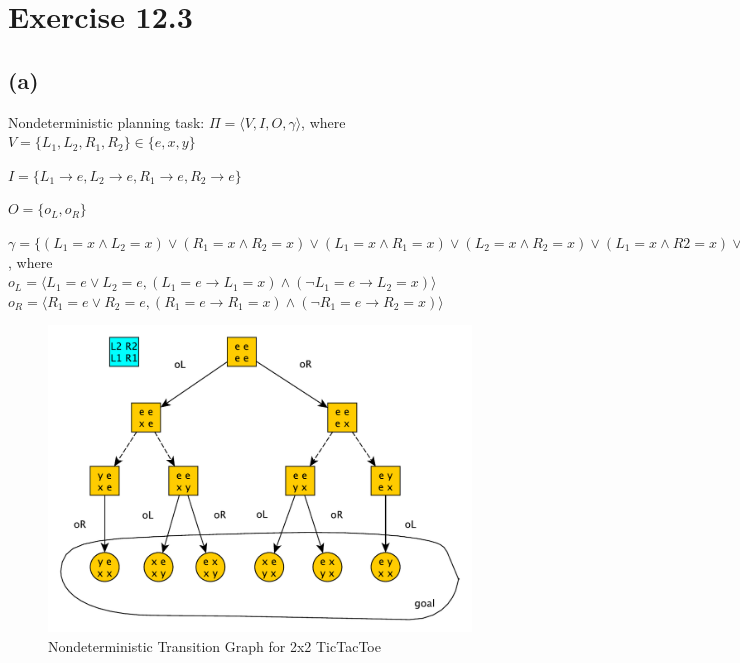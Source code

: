 \documentclass[11pt,a4paper]{article}
\begin{document}
\section*{Exercise 12.3}
\subsection*{(a)}
Nondeterministic planning task: $\Pi = \langle V, I, O, \gamma\rangle$, where\\

$V = \{L_1, L_2, R_1, R_2\} \in \{e, x, y\}$

$I = \{L_1 \to e, L_2 \to e, R_1 \to e, R_2 \to e\}$

$O = \{o_L, o_R\}$

$\gamma = \{(L_1=x \land L_2=x) \lor (R_1=x \land R_2=x) \lor (L_1=x \land R_1=x) \lor (L_2=x \land R_2=x) \lor (L_1=x \land R2=x) \lor (L_2=x \land R_1=x)   \}$, where \\

$o_L = \langle L_1=e \lor L_2=e, (L_1=e \to L_1=x) \land (\lnot L_1=e \to L_2=x)\rangle$ \\
$o_R = \langle R_1=e \lor R_2=e, (R_1=e \to R_1=x) \land (\lnot R_1=e \to R_2=x)\rangle$

\begin{figure}[h!]
\centering
\includegraphics[scale=0.45]{NondeterministicTicTacToe}
\caption{Nondeterministic Transition Graph for 2x2 TicTacToe}
\end{figure}
\end{document}
